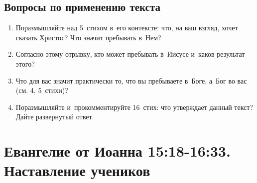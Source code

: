 \documentclass[a4paper,12pt]{article}
\begin{document}
\subsection*{Вопросы по применению текста} 
\begin{enumerate}
    \item Поразмышляйте над 5~стихом в~его контексте: что, на ваш взгляд, хочет сказать Христос? Что значит пребывать в~Нем?
    
    \myline
    
    \myline
    \item Согласно этому отрывку, кто может пребывать в~Иисусе и~каков результат этого? 
    
    \myline
    
    \myline
    \item Что для вас значит практически то, что вы пребываете в~Боге, а~Бог во вас (см. 4, 5~стихи)? 
    
    \myline
    
    \myline
    \item Поразмышляйте и~прокомментируйте 16~стих: что утверждает данный текст? Дайте развернутый ответ.
    
    \myline
    
    \myline
\end{enumerate}



\section{Евангелие от Иоанна 15:18-16:33. Наставление учеников}
\end{document}
